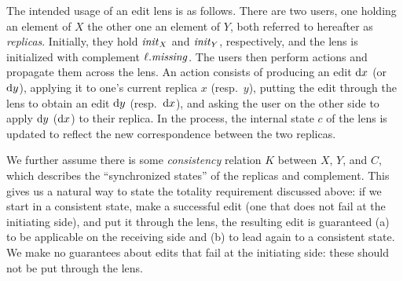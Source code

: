 The intended usage of an edit lens is as follows. There are two users,
one holding an element of $X$ the other one an element of $Y$, both
referred to hereafter as {\em replicas}.  Initially, they hold $\mathit{init}_X$ and
$\mathit{init}_Y$, respectively, and the lens is initialized with complement
$\ell.\mathit{missing}$. The users then perform actions and propagate them across
the lens. An action consists of producing an edit $\textrm{d} x$ (or $\textrm{d} y$), applying
it to one's current replica $x$ (resp.\ $y$), putting the edit through the lens
to obtain an edit $\textrm{d} y$ (resp.\ $\textrm{d} x$), and asking the user on the other
side to apply $\textrm{d} y$ ($\textrm{d} x$) to their replica.  In the process, the internal
state $c$ of the lens is updated to reflect the new correspondence between
the two replicas.
\iffull

\fi%
We further assume there is some {\em consistency} relation $K$ between $X$,
$Y$, and $C$, which describes the ``synchronized states'' of the replicas
and complement.  This gives us a natural way to state the totality
requirement discussed above: if we start in a consistent state, make a
successful edit (one that does not fail at the initiating side), and put it
through the lens, the resulting edit is guaranteed (a) to be applicable on
the receiving side and (b) to lead again to a consistent state.  We make no
guarantees about edits that fail at the initiating side: these should not be
put through the lens.

